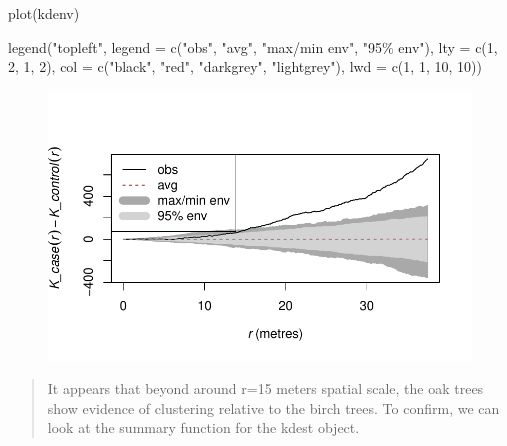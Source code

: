 \documentclass[
  letterpaper,
  DIV=11,
  numbers=noendperiod]{scrartcl}
\newenvironment{Shaded}{\begin{snugshade}}{\end{snugshade}}
\newcommand{\AttributeTok}[1]{\textcolor[rgb]{0.40,0.45,0.13}{#1}}
\newcommand{\DecValTok}[1]{\textcolor[rgb]{0.68,0.00,0.00}{#1}}
\newcommand{\FunctionTok}[1]{\textcolor[rgb]{0.28,0.35,0.67}{#1}}
\newcommand{\NormalTok}[1]{\textcolor[rgb]{0.00,0.23,0.31}{#1}}
\newcommand{\StringTok}[1]{\textcolor[rgb]{0.13,0.47,0.30}{#1}}
\begin{document}
\begin{Shaded}
\begin{Highlighting}[]
\FunctionTok{plot}\NormalTok{(kdenv)}

\FunctionTok{legend}\NormalTok{(}\StringTok{"topleft"}\NormalTok{, }\AttributeTok{legend =} \FunctionTok{c}\NormalTok{(}\StringTok{"obs"}\NormalTok{, }\StringTok{"avg"}\NormalTok{, }\StringTok{"max/min env"}\NormalTok{, }\StringTok{"95\% env"}\NormalTok{),}
       \AttributeTok{lty =} \FunctionTok{c}\NormalTok{(}\DecValTok{1}\NormalTok{, }\DecValTok{2}\NormalTok{, }\DecValTok{1}\NormalTok{, }\DecValTok{2}\NormalTok{), }\AttributeTok{col =} \FunctionTok{c}\NormalTok{(}\StringTok{"black"}\NormalTok{, }\StringTok{"red"}\NormalTok{, }\StringTok{"darkgrey"}\NormalTok{, }\StringTok{"lightgrey"}\NormalTok{),}
       \AttributeTok{lwd =} \FunctionTok{c}\NormalTok{(}\DecValTok{1}\NormalTok{, }\DecValTok{1}\NormalTok{, }\DecValTok{10}\NormalTok{, }\DecValTok{10}\NormalTok{))}
\end{Highlighting}
\end{Shaded}

\begin{figure}[H]

{\centering \includegraphics{cc-r-kd-hw_files/figure-pdf/unnamed-chunk-6-2.pdf}

}

\end{figure}

\begin{quote}
It appears that beyond around r=15 meters spatial scale, the oak trees
show evidence of clustering relative to the birch trees. To confirm, we
can look at the summary function for the kdest object.
\end{quote}
\end{document}
